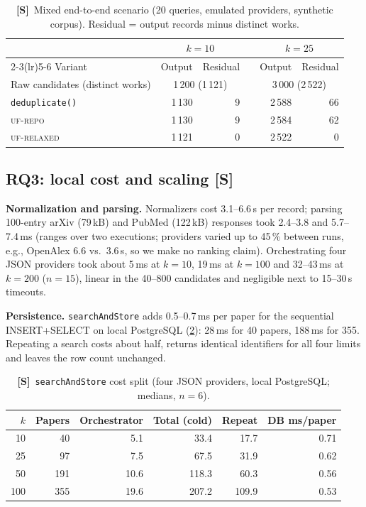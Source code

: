 \documentclass[conference]{IEEEtran}
\newcommand{\code}[1]{\texttt{\small #1}}
\begin{document}
\begin{table}[t]
\centering
\caption{\textbf{[S]}~Mixed end-to-end scenario (20 queries, emulated providers, synthetic corpus). Residual = output records minus distinct works.}
\label{tab:e2d}
\footnotesize
\setlength{\tabcolsep}{3pt}
\begin{tabular}{@{}l r r r r r@{}}
\toprule
 & \multicolumn{2}{c}{$k{=}10$} & & \multicolumn{2}{c}{$k{=}25$} \\
\cmidrule(lr){2-3}\cmidrule(lr){5-6}
Variant & Output & Residual & & Output & Residual \\
\midrule
Raw candidates (distinct works) & \multicolumn{2}{c}{1\,200 (1\,121)} & & \multicolumn{2}{c}{3\,000 (2\,522)} \\
\code{deduplicate()} & 1\,130 & 9 & & 2\,588 & 66 \\
\textsc{uf-repo} & 1\,130 & 9 & & 2\,584 & 62 \\
\textsc{uf-relaxed} & 1\,121 & 0 & & 2\,522 & 0 \\
\bottomrule
\end{tabular}
\end{table}

\subsection{RQ3: local cost and scaling [S]}
\textbf{Normalization and parsing.} Normalizers cost 3.1--6.6\,\textmu s per record; parsing 100-entry arXiv (79\,kB) and PubMed (122\,kB) responses took 2.4--3.8 and 5.7--7.4\,ms (ranges over two executions; providers varied up to 45\,\% between runs, e.g., OpenAlex 6.6 vs.\ 3.6\,\textmu s, so we make no ranking claim). Orchestrating four JSON providers took about 5\,ms at $k{=}10$, 19\,ms at $k{=}100$ and 32--43\,ms at $k{=}200$ ($n{=}15$), linear in the 40--800 candidates and negligible next to 15--30\,s timeouts.

\textbf{Persistence.} \code{searchAndStore} adds 0.5--0.7\,ms per paper for the sequential INSERT+SELECT on local PostgreSQL (\cref{tab:db}): 28\,ms for 40 papers, 188\,ms for 355. Repeating a search costs about half, returns identical identifiers for all four limits and leaves the row count unchanged.

\begin{table}[t]
\centering
\caption{\textbf{[S]}~\code{searchAndStore} cost split (four JSON providers, local PostgreSQL; medians, $n{=}6$).}
\label{tab:db}
\footnotesize
\setlength{\tabcolsep}{3pt}
\begin{tabular}{@{}r r r r r r@{}}
\toprule
$k$ & Papers & Orchestrator & Total (cold) & Repeat & DB ms/paper \\
\midrule
10 & 40 & 5.1 & 33.4 & 17.7 & 0.71 \\
25 & 97 & 7.5 & 67.5 & 31.9 & 0.62 \\
50 & 191 & 10.6 & 118.3 & 60.3 & 0.56 \\
100 & 355 & 19.6 & 207.2 & 109.9 & 0.53 \\
\bottomrule
\end{tabular}
\end{table}
\end{document}
